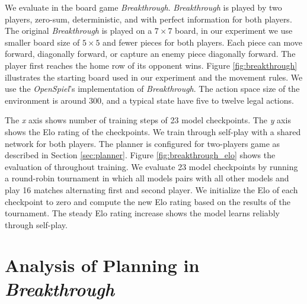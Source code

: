 
We evaluate \moozi in the board game \textit{Breakthrough}.
\textit{Breakthrough} is played by two players, zero-sum, deterministic, and with perfect information for both players.
The original \textit{Breakthrough} is played on a $7 \times 7$ board, in our experiment we use smaller board size of \(5 \times 5\) and fewer pieces for both players.
Each piece can move forward, diagonally forward, or capture an enemy piece diagonally forward.
The player first reaches the home row of its opponent wins.
Figure \ref{fig:breakthrough} illustrates the starting board used in our experiment and the movement rules.
We use the \textit{OpenSpiel}'s implementation of \textit{Breakthrough}.
The action space size of the environment is around 300, and a typical state have five to twelve legal actions.

{
    The \textit{x} axis shows number of training steps of 23 model checkpoints.
    The \textit{y} axis shows the Elo rating of the checkpoints.
}
We train \moozi through self-play with a shared network for both players.
The planner is configured for two-players game as described in Section \ref{sec:planner}.
Figure \ref{fig:breakthrough_elo} shows the evaluation of \moozi throughout training.
We evaluate 23 model checkpoints by running a round-robin tournament in which all models pairs with all other models and play 16 matches alternating first and second player.
We initialize the Elo of each checkpoint to zero and compute the new Elo rating based on the results of the tournament.
The steady Elo rating increase shows the model learns reliably through self-play.


\section{Analysis of Planning in \textit{Breakthrough}} \label{sec:exp:plan_breakthrough}

